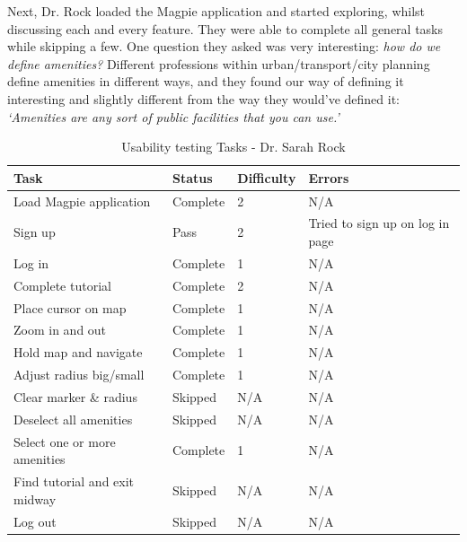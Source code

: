 \noindent Next, Dr. Rock loaded the Magpie application and started exploring,
whilst discussing each and every feature. They were able to complete all general
tasks while skipping a few. One question they asked was very interesting:
\emph{how do we define amenities?} Different professions within
urban/transport/city planning define amenities in different ways, and they found
our way of defining it interesting and slightly different from the way they
would've defined it: \emph{`Amenities are any sort of public facilities that you
can use.'}
\begin{table}[h!]
    \centering
    \caption{Usability testing Tasks - Dr. Sarah Rock}
    \begin{tabular}{|p{}|p{}|p{}|p{}|}
        \hline
        \textbf{Task}                 & \textbf{Status} & \textbf{Difficulty} & \textbf{Errors}                 \\
        \hline
        Load Magpie application       & Complete        & 2                   & N/A                             \\
        \hline
        Sign up                       & Pass            & 2                   & Tried to sign up on log in page \\
        \hline
        Log in                        & Complete        & 1                   & N/A                             \\
        \hline
        Complete tutorial             & Complete        & 2                   & N/A                             \\
        \hline
        Place cursor on map           & Complete        & 1                   & N/A                             \\
        \hline
        Zoom in and out               & Complete        & 1                   & N/A                             \\
        \hline
        Hold map and navigate         & Complete        & 1                   & N/A                             \\
        \hline
        Adjust radius big/small       & Complete        & 1                   & N/A                             \\
        \hline
        Clear marker \& radius        & Skipped         & N/A                 & N/A                             \\
        \hline
        Deselect all amenities        & Skipped         & N/A                 & N/A                             \\
        \hline
        Select one or more amenities  & Complete        & 1                   & N/A                             \\
        \hline
        Find tutorial and exit midway & Skipped         & N/A                 & N/A                             \\
        \hline
        Log out                       & Skipped         & N/A                 & N/A                             \\
        \hline
    \end{tabular}
\end{table}

